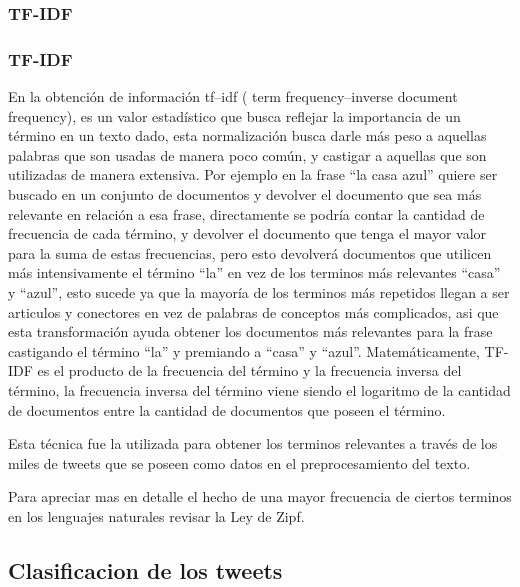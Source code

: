 \documentclass{beamer}
\begin{document}
\subsubsection{TF-IDF}
\begin{frame}
\frametitle{TF-IDF}
En la obtención de información tf–idf ( term frequency–inverse document frequency), es un valor estadístico que busca reflejar la importancia de un término en un texto dado,  esta normalización busca darle más peso a aquellas palabras que son usadas de manera poco común, y castigar a aquellas que son utilizadas de manera extensiva. Por ejemplo en la frase “la casa azul” quiere ser buscado en un conjunto de documentos y devolver el documento que sea más relevante en relación a esa frase, directamente se podría contar la cantidad de frecuencia de cada término, y devolver el documento que tenga el mayor valor para la suma de estas frecuencias, pero esto devolverá documentos que utilicen más intensivamente el término “la” en vez de los terminos más relevantes “casa” y “azul”, esto sucede ya que la mayoría de los terminos más repetidos llegan a ser articulos y conectores en vez de palabras de conceptos más complicados, asi que esta transformación ayuda obtener los documentos más relevantes para la frase castigando el término “la” y premiando a “casa” y “azul”. Matemáticamente, TF-IDF es el producto de la frecuencia del término y la frecuencia inversa del término, la frecuencia inversa del término viene siendo el logaritmo de la cantidad de documentos entre la cantidad de documentos que poseen el término.
 
Esta técnica fue la utilizada para obtener los terminos relevantes a través de los miles de tweets que se poseen como datos en el preprocesamiento del texto. 
 
Para apreciar mas en detalle el hecho de una mayor frecuencia de ciertos terminos en los lenguajes naturales  revisar la Ley de Zipf.
\end{frame}




\subsection{Clasificacion de los tweets}
\end{document}
